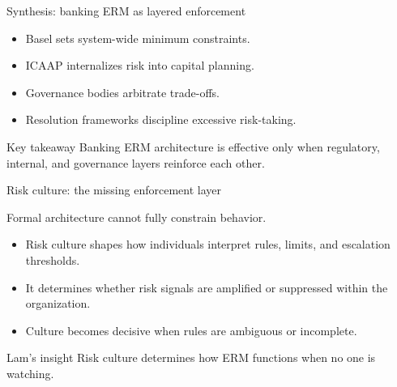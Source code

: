 \documentclass[aspectratio=169, 10pt]{beamer} %
\begin{document}
\begin{frame}{Synthesis: banking ERM as layered enforcement}

\begin{itemize}
  \item[$\bullet$] Basel sets system-wide minimum constraints.
  \item[$\bullet$] ICAAP internalizes risk into capital planning.
  \item[$\bullet$] Governance bodies arbitrate trade-offs.
  \item[$\bullet$] Resolution frameworks discipline excessive risk-taking.
\end{itemize}

\begin{block}{Key takeaway}
Banking ERM architecture is effective only when regulatory,
internal, and governance layers reinforce each other.
\end{block}

\end{frame}
\begin{frame}{Risk culture: the missing enforcement layer}

Formal architecture cannot fully constrain behavior.

\medskip

\begin{itemize}
  \item[$\bullet$] Risk culture shapes how individuals interpret rules,
  limits, and escalation thresholds.

  \item[$\bullet$] It determines whether risk signals are amplified or
  suppressed within the organization.

  \item[$\bullet$] Culture becomes decisive when rules are ambiguous
  or incomplete.
\end{itemize}

\begin{block}{Lam’s insight}
Risk culture determines how ERM functions when no one is watching.
\end{block}

\end{frame}
\end{document}
